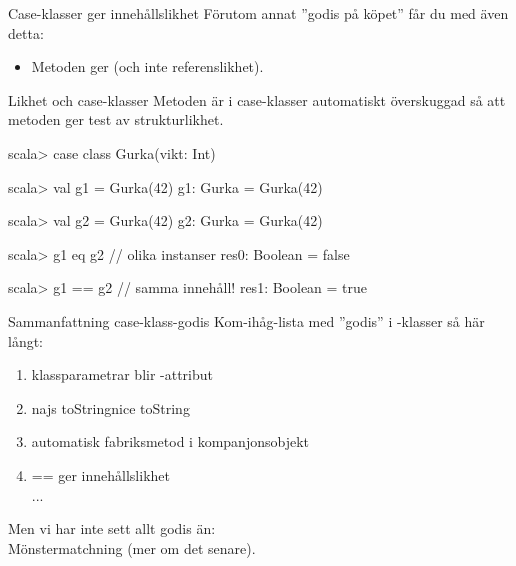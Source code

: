 

\begin{Slide}{Case-klasser ger innehållslikhet}
Förutom annat ''godis på köpet'' får du med  även detta:
\begin{itemize}
\item Metoden \code{==} ger  (och inte referenslikhet).
\end{itemize}
\end{Slide}



\begin{Slide}{Likhet och case-klasser}
Metoden  är i case-klasser automatiskt överskuggad så att metoden \code{==} ger test av strukturlikhet.
\begin{REPL}
scala> case class Gurka(vikt: Int)

scala> val g1 = Gurka(42)
g1: Gurka = Gurka(42)

scala> val g2 = Gurka(42)
g2: Gurka = Gurka(42)

scala> g1 eq g2          // olika instanser
res0: Boolean = false

scala> g1 == g2          // samma innehåll!
res1: Boolean = true
\end{REPL}
\end{Slide}



\begin{Slide}{Sammanfattning case-klass-godis}
Kom-ihåg-lista med ''godis'' i -klasser så här långt:
\begin{enumerate}
\item klassparametrar blir -attribut
\item \ifswedish najs toString\else nice toString\fi
\item automatisk fabriksmetod  i kompanjonsobjekt
\item == ger innehållslikhet 
\pause~\\...
\end{enumerate}

\vspace{1em}Men vi har inte sett allt godis än: \\Mönstermatchning (mer om det senare).
\end{Slide}
